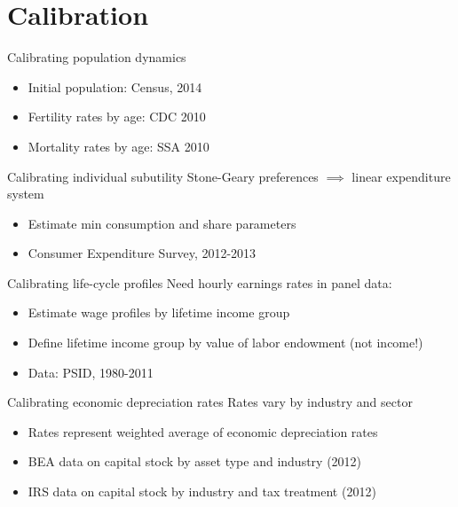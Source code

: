 \documentclass{beamer}
\begin{document}
\section{Calibration}

  \begin{frame}{Calibrating population dynamics}
  \begin{itemize}
  \item Initial population: Census, 2014
  \item Fertility rates by age: CDC 2010
  \item Mortality rates by age: SSA 2010
  \end{itemize}
  \end{frame}

  \begin{frame}{Calibrating individual subutility}
  Stone-Geary preferences $\implies$ linear expenditure system
  \begin{itemize}
  \item Estimate min consumption and share parameters
  \item Consumer Expenditure Survey, 2012-2013
  \end{itemize}
  \end{frame}

  \begin{frame}{Calibrating life-cycle profiles}
  Need hourly earnings rates in panel data:
  \begin{itemize}
  \item Estimate wage profiles by lifetime income group
  \item Define lifetime income group by value of labor endowment (not income!)
  \item Data: PSID, 1980-2011
  \end{itemize}
  \end{frame}

  \begin{frame}{Calibrating economic depreciation rates}
  Rates vary by industry and sector
  \begin{itemize}
  \item Rates represent weighted average of economic depreciation rates
  \item BEA data on capital stock by asset type and industry (2012)
  \item IRS data on capital stock by industry and tax treatment (2012)
  \end{itemize}
  \end{frame}
\end{document}
